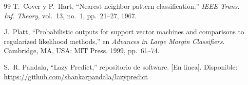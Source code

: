 \documentclass[conference]{IEEEtran}
\begin{document}
\begin{thebibliography}{99}
T.~Cover y P.~Hart, ``Nearest neighbor pattern classification,'' \emph{IEEE Trans. Inf. Theory}, vol.~13, no.~1, pp.~21--27, 1967.

J.~Platt, ``Probabilistic outputs for support vector machines and comparisons to regularized likelihood methods,'' en \emph{Advances in Large Margin Classifiers}. Cambridge, MA, USA: MIT Press, 1999, pp.~61--74.

S.~R. Pandala, ``Lazy Predict,'' repositorio de software. [En línea]. Disponible: \url{https://github.com/shankarpandala/lazypredict}

\end{thebibliography}
\end{document}

